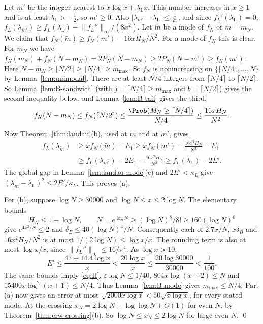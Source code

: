 Let $m'$ be the integer nearest to $x\log x+\lambda_{\mathrm L}x$. This number
increases in $x\ge1$ and is at least $\lambda_{\mathrm L}>-\frac12$, so $m'\ge0$. Also
$\lvert\lambda_{m'}-\lambda_{\mathrm L}\rvert\le\frac1{2x}$, and since
$f_L'(\lambda_{\mathrm L})=0$,
$f_L(\lambda_{m'})\ge f_L(\lambda_{\mathrm L})-\lVert f_L''\rVert_\infty/(8x^2)$. Let
$\tilde m$ be a mode of $f_N$ or $\tilde m=m_N$. We claim that
$f_N(\tilde m)\ge f_N(m')-16xH_N/N^2$. For a mode of $f_N$ this is clear.
For $m_N$ we have
$f_N(m_N)+f_N(N-m_N)=2P_N(N-m_N)\ge2P_N(N-m')\ge f_N(m')$. Here
$N-m_N\ge\lceil N/2\rceil\ge\lceil N/4\rceil\ge m_{\max}$. So
$f_N$ is nonincreasing on $\{\lceil N/4\rceil,\dots,N\}$ by
Lemma~\ref{lem:unimodal}. There are at least $N/4$ integers from
$\lceil N/4\rceil$ to $\lceil N/2\rceil$. So Lemma~\ref{lem:B-sandwich}
(with $j=\lceil N/4\rceil\ge m_{\max}$ and $b=\lceil N/2\rceil$) gives the second
inequality below, and Lemma~\ref{lem:B-tail} gives the third,
\[
 f_N(N-m_N)\le f_N(\lceil N/2\rceil)\le\frac{\Prob(M_N\ge\lceil N/4\rceil)}{N/4}
 \le\frac{16xH_N}{N^2}.
\]
Now Theorem~\ref{thm:landau}(b), used at $\tilde m$ and at $m'$, gives
\[
 \begin{aligned}
 f_L(\lambda_{\tilde m})&\ge xf_N(\tilde m)-E_1
 \ge xf_N(m')-\frac{16x^2H_N}{N^2}-E_1\\
 &\ge f_L(\lambda_{m'})-2E_1-\frac{16x^2H_N}{N^2}
 \ge f_L(\lambda_{\mathrm L})-2E'.
 \end{aligned}
\]
The global gap in Lemma~\ref{lem:landau-mode}(c) and $2E'<\kappa_L$
give $(\lambda_{\tilde m}-\lambda_{\mathrm L})^2\le2E'/\kappa_L$.
This proves (a).

For (b), suppose $\log N\ge30000$ and $\log N\le x\le2\log N$.
The elementary bounds
\[
 H_N\le1+\log N,\qquad
 N=e^{\log N}\ge(\log N)^8/8!\ge160(\log N)^6
\]
give $e^{4x^2/N}\le2$ and $\delta_B\le40(\log N)^4/N$.
Consequently each of $2.7x/N$, $x\delta_B$ and
$16x^2H_N/N^2$ is at most $1/(2\log N)\le\log x/x$.
The rounding term is also at most $\log x/x$, since
$\|f_L''\|_\infty\le16/\pi^4$. As $\log x>10$,
\[
 E'\le\frac{47+14.4\log x}{x}
       <\frac{20\log x}{x}
       \le\frac{20\log30000}{30000}<\frac1{100}.
\]
The same bounds imply \eqref{eq:H},
$\varepsilon\log N\le1/40$, $804x\log(x+2)\le N$ and
$15400x\log^2(x+1)\le N/4$. Thus Lemma~\ref{lem:B-mode} gives
$m_{\max}\le N/4$. Part (a) now gives an error at most
$\sqrt{2000x\log x}<50\sqrt{x\log x}$, for every stated mode.
At the crossing
$x_N=2\log N-\log\log N+O(1)$ for even $N$, by Theorem~\ref{thm:erw-crossing}(b). So
$\log N\le x_N\le2\log N$ for large even $N$. \qed
